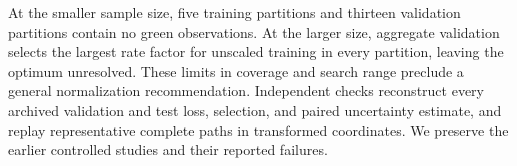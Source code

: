 At the smaller sample size, five training partitions and thirteen validation
partitions contain no green observations. At the larger size, aggregate
validation selects the largest rate factor for unscaled training in every
partition, leaving the optimum unresolved. These limits in coverage and search
range preclude a general normalization recommendation. Independent checks
reconstruct every archived validation and test loss, selection, and paired
uncertainty estimate, and replay representative complete paths in transformed
coordinates. We preserve the earlier controlled studies and their reported
failures.
